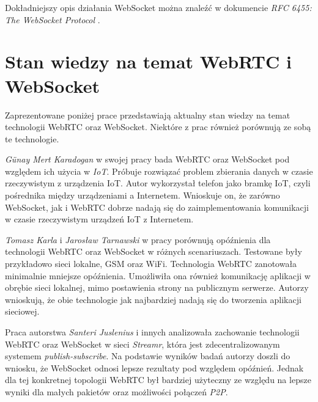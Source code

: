 \documentclass[language=polish,type=master]{aghmodern}
\begin{document}
Dokładniejszy opis działania WebSocket można znaleźć w dokumencie \emph{RFC 6455: The WebSocket Protocol} \cite{RFC6455}.

\pagebreak

\section{Stan wiedzy na temat WebRTC i WebSocket}
Zaprezentowane poniżej prace przedstawiają aktualny stan wiedzy na temat technologii WebRTC oraz WebSocket.
Niektóre z prac również porównują ze sobą te technologie.

\emph{G{\"u}nay Mert Karadogan} w swojej pracy \cite{websocket_webrtc_iot} bada WebRTC oraz WebSocket pod względem ich użycia w \emph{IoT}\footnotemark{}.
Próbuje rozwiązać problem zbierania danych w czasie rzeczywistym z urządzenia IoT.
Autor wykorzystał telefon jako bramkę IoT, czyli pośrednika między urządzeniami a Internetem.
Wnioskuje on, że zarówno WebSocket, jak i WebRTC dobrze nadają się do zaimplementowania komunikacji w czasie rzeczywistym urządzeń IoT z Internetem.

\emph{Tomasz Karla} i \emph{Jarosław Tarnawski} w pracy \cite{websocket_webrtc_realtime} porównują opóźnienia dla technologii WebRTC oraz WebSocket w różnych scenariuszach.
Testowane były przykładowo sieci lokalne, GSM oraz WiFi. Technologia WebRTC zanotowała minimalnie mniejsze opóźnienia.
Umożliwiła ona również komunikację aplikacji w obrębie sieci lokalnej\footnotemark{}, mimo postawienia strony na publicznym serwerze.
Autorzy wnioskują, że obie technologie jak najbardziej nadają się do tworzenia aplikacji sieciowej.

Praca \cite{websocket_webrtc_streamr} autorstwa \emph{Santeri Juslenius} i innych analizowała zachowanie technologii WebRTC oraz WebSocket w sieci \emph{Streamr}, która jest zdecentralizowanym systemem \emph{publish-subscribe}\footnotemark{}.
Na podstawie wyników badań autorzy doszli do wniosku, że WebSocket odnosi lepsze rezultaty pod względem opóźnień.
Jednak dla tej konkretnej topologii WebRTC był bardziej użyteczny ze względu na lepsze wyniki dla małych pakietów oraz możliwości połączeń \emph{P2P}\footnotemark{}.
\end{document}
